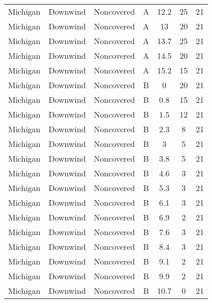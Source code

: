 \documentclass{article}
\begin{document}
\begin{longtable}[c]{ccccccc}
Michigan  & Downwind  & Noncovered & A               & 12.2         & 25          & 21  \\
Michigan  & Downwind  & Noncovered & A               & 13           & 20          & 21  \\
Michigan  & Downwind  & Noncovered & A               & 13.7         & 25          & 21  \\
Michigan  & Downwind  & Noncovered & A               & 14.5         & 20          & 21  \\
Michigan  & Downwind  & Noncovered & A               & 15.2         & 15          & 21  \\
Michigan  & Downwind  & Noncovered & B               & 0            & 20          & 21  \\
Michigan  & Downwind  & Noncovered & B               & 0.8          & 15          & 21  \\
Michigan  & Downwind  & Noncovered & B               & 1.5          & 12          & 21  \\
Michigan  & Downwind  & Noncovered & B               & 2.3          & 8           & 21  \\
Michigan  & Downwind  & Noncovered & B               & 3            & 5           & 21  \\
Michigan  & Downwind  & Noncovered & B               & 3.8          & 5           & 21  \\
Michigan  & Downwind  & Noncovered & B               & 4.6          & 3           & 21  \\
Michigan  & Downwind  & Noncovered & B               & 5.3          & 3           & 21  \\
Michigan  & Downwind  & Noncovered & B               & 6.1          & 3           & 21  \\
Michigan  & Downwind  & Noncovered & B               & 6.9          & 2           & 21  \\
Michigan  & Downwind  & Noncovered & B               & 7.6          & 3           & 21  \\
Michigan  & Downwind  & Noncovered & B               & 8.4          & 3           & 21  \\
Michigan  & Downwind  & Noncovered & B               & 9.1          & 2           & 21  \\
Michigan  & Downwind  & Noncovered & B               & 9.9          & 2           & 21  \\
Michigan  & Downwind  & Noncovered & B               & 10.7         & 0           & 21  \\

\end{longtable}
\end{document}
